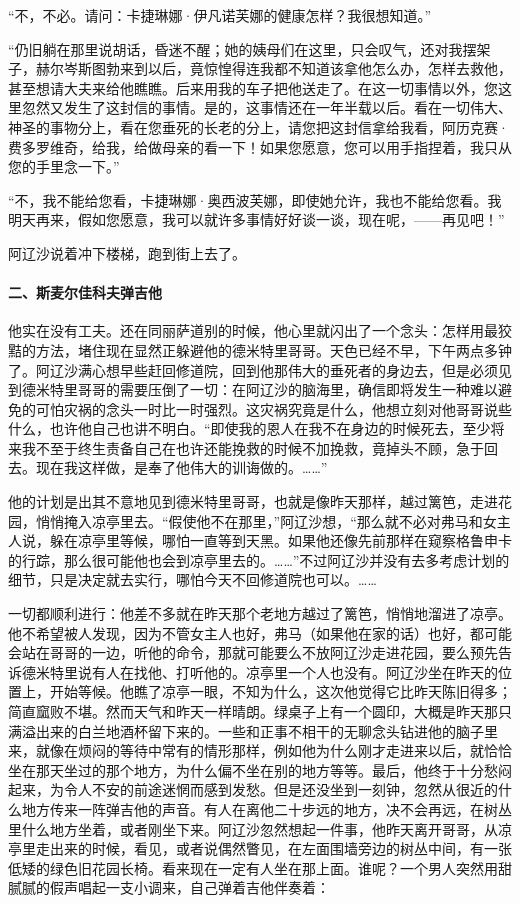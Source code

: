 \par “不，不必。请问：卡捷琳娜·伊凡诺芙娜的健康怎样？我很想知道。”
\par “仍旧躺在那里说胡话，昏迷不醒；她的姨母们在这里，只会叹气，还对我摆架子，赫尔岑斯图勃来到以后，竟惊惶得连我都不知道该拿他怎么办，怎样去救他，甚至想请大夫来给他瞧瞧。后来用我的车子把他送走了。在这一切事情以外，您这里忽然又发生了这封信的事情。是的，这事情还在一年半载以后。看在一切伟大、神圣的事物分上，看在您垂死的长老的分上，请您把这封信拿给我看，阿历克赛·费多罗维奇，给我，给做母亲的看一下！如果您愿意，您可以用手指捏着，我只从您的手里念一下。”
\par “不，我不能给您看，卡捷琳娜·奥西波芙娜，即使她允许，我也不能给您看。我明天再来，假如您愿意，我可以就许多事情好好谈一谈，现在呢，——再见吧！”
\par 阿辽沙说着冲下楼梯，跑到街上去了。
\paragraph*{二、斯麦尔佳科夫弹吉他}
\par 他实在没有工夫。还在同丽萨道别的时候，他心里就闪出了一个念头：怎样用最狡黠的方法，堵住现在显然正躲避他的德米特里哥哥。天色已经不早，下午两点多钟了。阿辽沙满心想早些赶回修道院，回到他那伟大的垂死者的身边去，但是必须见到德米特里哥哥的需要压倒了一切：在阿辽沙的脑海里，确信即将发生一种难以避免的可怕灾祸的念头一时比一时强烈。这灾祸究竟是什么，他想立刻对他哥哥说些什么，也许他自己也讲不明白。“即使我的恩人在我不在身边的时候死去，至少将来我不至于终生责备自己在也许还能挽救的时候不加挽救，竟掉头不顾，急于回去。现在我这样做，是奉了他伟大的训诲做的。……”
\par 他的计划是出其不意地见到德米特里哥哥，也就是像昨天那样，越过篱笆，走进花园，悄悄掩入凉亭里去。“假使他不在那里，”阿辽沙想，“那么就不必对弗马和女主人说，躲在凉亭里等候，哪怕一直等到天黑。如果他还像先前那样在窥察格鲁申卡的行踪，那么很可能他也会到凉亭里去的。……”不过阿辽沙并没有去多考虑计划的细节，只是决定就去实行，哪怕今天不回修道院也可以。……
\par 一切都顺利进行：他差不多就在昨天那个老地方越过了篱笆，悄悄地溜进了凉亭。他不希望被人发现，因为不管女主人也好，弗马（如果他在家的话）也好，都可能会站在哥哥的一边，听他的命令，那就可能要么不放阿辽沙走进花园，要么预先告诉德米特里说有人在找他、打听他的。凉亭里一个人也没有。阿辽沙坐在昨天的位置上，开始等候。他瞧了凉亭一眼，不知为什么，这次他觉得它比昨天陈旧得多；简直窳败不堪。然而天气和昨天一样晴朗。绿桌子上有一个圆印，大概是昨天那只满溢出来的白兰地酒杯留下来的。一些和正事不相干的无聊念头钻进他的脑子里来，就像在烦闷的等待中常有的情形那样，例如他为什么刚才走进来以后，就恰恰坐在那天坐过的那个地方，为什么偏不坐在别的地方等等。最后，他终于十分愁闷起来，为令人不安的前途迷惘而感到发愁。但是还没坐到一刻钟，忽然从很近的什么地方传来一阵弹吉他的声音。有人在离他二十步远的地方，决不会再远，在树丛里什么地方坐着，或者刚坐下来。阿辽沙忽然想起一件事，他昨天离开哥哥，从凉亭里走出来的时候，看见，或者说偶然瞥见，在左面围墙旁边的树丛中间，有一张低矮的绿色旧花园长椅。看来现在一定有人坐在那上面。谁呢？一个男人突然用甜腻腻的假声唱起一支小调来，自己弹着吉他伴奏着：
